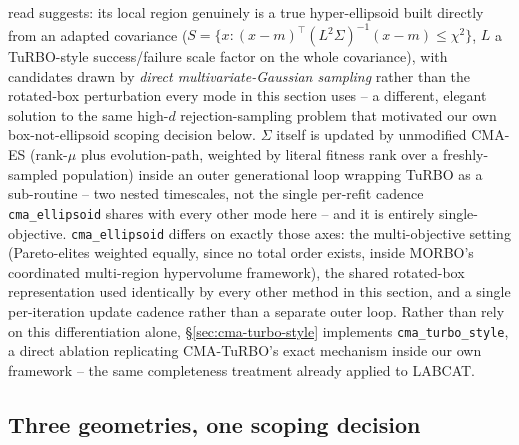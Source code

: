 \documentclass[11pt]{article}
\begin{document}
read suggests: its local region genuinely is a true hyper-ellipsoid built
directly from an adapted covariance
($S=\{x : (x-m)^\top(L^2\Sigma)^{-1}(x-m)\le\chi^2\}$, $L$ a TuRBO-style
success/failure scale factor on the whole covariance), with candidates
drawn by \emph{direct multivariate-Gaussian sampling} rather than the
rotated-box perturbation every mode in this section uses -- a different,
elegant solution to the same high-$d$ rejection-sampling problem that
motivated our own box-not-ellipsoid scoping decision below. $\Sigma$ itself
is updated by unmodified CMA-ES (rank-$\mu$ plus evolution-path, weighted
by literal fitness rank over a freshly-sampled population) inside an outer
generational loop wrapping TuRBO as a sub-routine -- two nested timescales,
not the single per-refit cadence \texttt{cma\_ellipsoid} shares with every
other mode here -- and it is entirely single-objective. \texttt{cma\_ellipsoid}
differs on exactly those axes: the multi-objective setting (Pareto-elites
weighted equally, since no total order exists, inside MORBO's coordinated
multi-region hypervolume framework), the shared rotated-box representation
used identically by every other method in this section, and a single
per-iteration update cadence rather than a separate outer loop. Rather than
rely on this differentiation alone, \S\ref{sec:cma-turbo-style} implements
\texttt{cma\_turbo\_style}, a direct ablation replicating CMA-TuRBO's exact
mechanism inside our own framework -- the same completeness treatment
already applied to LABCAT.

\subsection{Three geometries, one scoping decision}
\end{document}
